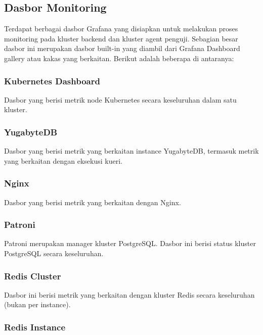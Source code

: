 \subsection{Dasbor Monitoring}

Terdapat berbagai dasbor Grafana yang disiapkan untuk melakukan proses monitoring pada kluster backend dan kluster agent penguji. Sebagian besar dasbor ini merupakan dasbor built-in yang diambil dari Grafana Dashboard gallery atau kakas yang berkaitan. Berikut adalah beberapa di antaranya:

\subsubsection{Kubernetes Dashboard}

Dasbor yang berisi metrik node Kubernetes secara keseluruhan dalam satu kluster.

\subsubsection{YugabyteDB}

Dasbor yang berisi metrik yang berkaitan instance YugabyteDB, termasuk metrik yang berkaitan dengan eksekusi kueri.

\subsubsection{Nginx}

Dasbor yang berisi metrik yang berkaitan dengan Nginx.

\subsubsection{Patroni}

Patroni merupakan manager kluster PostgreSQL. Dasbor ini berisi status kluster PostgreSQL secara keseluruhan.

\subsubsection{Redis Cluster}

Dasbor ini berisi metrik yang berkaitan dengan kluster Redis secara keseluruhan (bukan per instance).

\subsubsection{Redis Instance}

